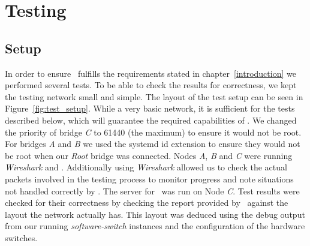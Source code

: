 \chapter{Testing}
\label{testing}
\section{Setup}
In order to ensure \tool\ fulfills the requirements stated in chapter~\ref{introduction} we performed several tests.
To be able to check the results for correctness, we kept the testing network small and simple.
The layout of the test setup can be seen in Figure~\ref{fig:test_setup}.
While a very basic network, it is sufficient for the tests described below, which will guarantee the required capabilities of \tool.
We changed the priority of bridge \textit{C} to 61440 (the maximum) to ensure it would not be root.
For bridges \textit{A} and \textit{B} we used the systemd id extension to ensure they would not be root when our \textit{Root} bridge was connected.
Nodes \textit{A}, \textit{B} and \textit{C} were running \textit{Wireshark} and \tool.
Additionally using \textit{Wireshark} allowed us to check the actual packets involved in the testing process to monitor progress and note situations not handled correctly by \tool.
The server for \tool\ was run on Node \textit{C}.
Test results were checked for their correctness by checking the report provided by \tool\ against the layout the network actually has.
This layout was deduced using the debug output from our running \textit{software-switch} instances and the configuration of the hardware switches.

